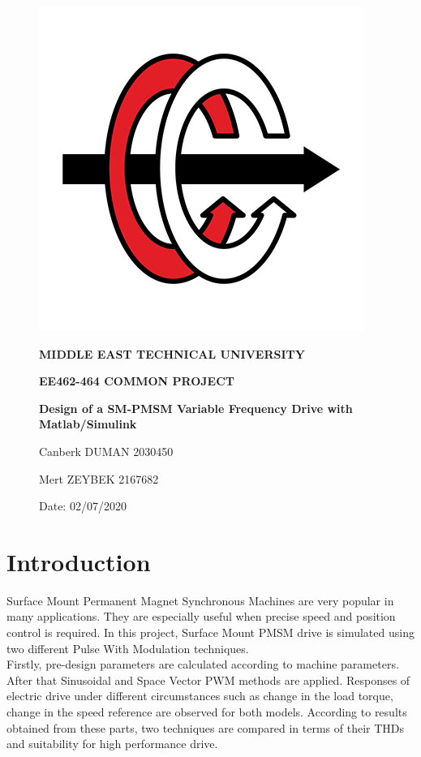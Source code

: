 \documentclass{article}
\date{}
\newcommand\tab[1][1cm]{\hspace*{#1}}
\begin{document}
\begin{figure}[!tp]
\vspace{-10mm}
\includegraphics[scale=0.8]{ee.png}


\vfil
\hfil \Large \bf MIDDLE EAST TECHNICAL UNIVERSITY
 \hfil
\vfil

\vspace{5mm}
\vfil
\hfil \large \bf  EE462-464 COMMON PROJECT
 \hfil
\vfil
\begin{center}
\vspace{5mm}
\vfil
\hfil \large \bf Design of a SM-PMSM
Variable Frequency Drive with Matlab/Simulink \hfil
\vfil
\bf
\end{center}

\vspace{23mm}
Canberk DUMAN    \tab2030450


Mert ZEYBEK \tab\tab2167682


\vspace{5mm}
\small Date: 02/07/2020


\end{figure}

\newpage

\section*{Introduction}
\tab Surface Mount Permanent Magnet Synchronous Machines are very popular in many applications. They are especially useful when precise speed and position control is required. In this project, Surface Mount PMSM drive is simulated using two different Pulse With Modulation techniques. \\
\tab Firstly, pre-design parameters are calculated according to machine parameters. After that Sinusoidal and Space Vector PWM methods are applied. Responses of electric drive under different circumstances such as change in the load torque, change in the speed reference are observed for both models. According to results obtained from these parts, two techniques are compared in terms of their THDs and suitability for high performance drive.
\end{document}
